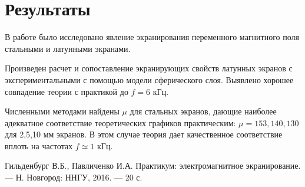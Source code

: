 \section{Результаты}
	В работе было исследовано явление экранирования переменного магнитного поля стальными и латунными экранами. 

	Произведен расчет и сопоставление экранирующих свойств латунных экранов с экспериментальными с помощью модели сферического слоя. Выявлено хорошее совпадение теории с практикой до $f=6$ кГц. 

	Численными методами найдены $\mu$ для стальных экранов, дающие наиболее адекватное соответствие теоретических графиков практическим: $\mu=153,140,130$ для 2,5,10 мм экранов. В этом случае теория дает качественное соответствие вплоть на частотах $f \simeq 1$ кГц.


\begin{thebibliography}{}
	 Гильденбург В.Б., Павличенко И.А. Практикум: электромагнитное экранирование. --- Н. Новгород: ННГУ, 2016. --- 20 с.
\end{thebibliography}

